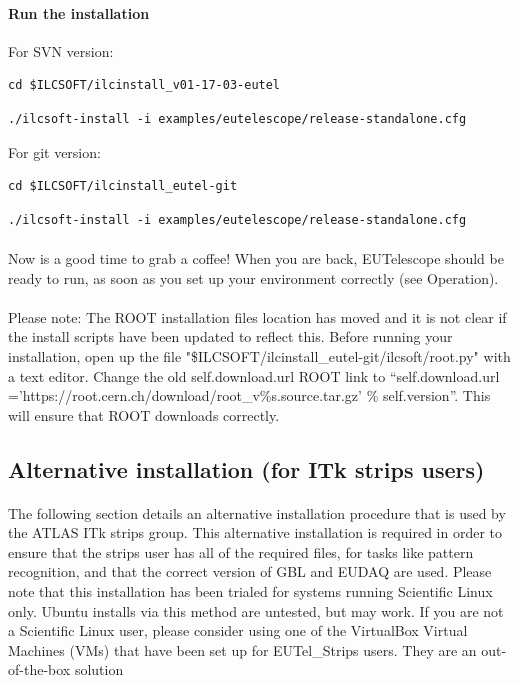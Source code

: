 \documentclass[11pt]{article}
\begin{document}
\paragraph{Run the installation}
For SVN version:\\
\begin{verbatim}
cd $ILCSOFT/ilcinstall_v01-17-03-eutel
\end{verbatim}
\begin{verbatim}
./ilcsoft-install -i examples/eutelescope/release-standalone.cfg
\end{verbatim}
For git version:\\
\begin{verbatim}
cd $ILCSOFT/ilcinstall_eutel-git
\end{verbatim}
\begin{verbatim}
./ilcsoft-install -i examples/eutelescope/release-standalone.cfg
\end{verbatim}
\paragraph{}
Now is a good time to grab a coffee! When you are back, EUTelescope should be ready to run, as soon as you set up your environment correctly (see Operation).
\paragraph{}
Please note: The ROOT installation files location has moved and it is not clear if the install scripts have been updated to reflect this. Before running your installation, open up the file "\$ILCSOFT/ilcinstall\_eutel-git/ilcsoft/root.py" with a text editor. Change the old self.download.url ROOT link to ``self.download.url ='https://root.cern.ch/download/root\_v\%s.source.tar.gz' \% self.version''. This will ensure that ROOT downloads correctly. 
\subsection{Alternative installation (for ITk strips users)}
\paragraph{}
The following section details an alternative installation procedure that is used by the ATLAS ITk strips group. This alternative installation is required in order to ensure that the strips user has all of the required files, for tasks like pattern recognition, and that the correct version of GBL and EUDAQ are used. Please note that this installation has been trialed for systems running Scientific Linux only. Ubuntu installs via this method are untested, but may work. If you are not a Scientific Linux user, please consider using one of the VirtualBox Virtual Machines (VMs) that have been set up for EUTel\_Strips users. They are an out-of-the-box solution
\end{document}
